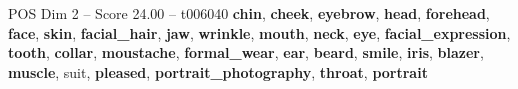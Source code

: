 \begin{textsample}{POS Dim 2 – Score 24.00 – t006040}  \label{ex:f2_pos_012}
\textbf{chin}, \textbf{cheek}, \textbf{eyebrow}, \textbf{head}, \textbf{forehead}, \textbf{face}, \textbf{skin}, \textbf{facial\_hair}, \textbf{jaw}, \textbf{wrinkle}, \textbf{mouth}, \textbf{neck}, \textbf{eye}, \textbf{facial\_expression}, \textbf{tooth}, \textbf{collar}, \textbf{moustache}, \textbf{formal\_wear}, \textbf{ear}, \textbf{beard}, \textbf{smile}, \textbf{iris}, \textbf{blazer}, \textbf{muscle}, suit, \textbf{pleased}, \textbf{portrait\_photography}, \textbf{throat}, \textbf{portrait}

\end{textsample}
